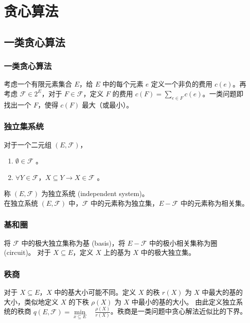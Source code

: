 \section{贪心算法}
\subsection{一类贪心算法}
\subsubsection{一类贪心算法}
考虑一个有限元素集合 $E$，给 $E$ 中的每个元素 $e$ 定义一个非负的费用 $c(e)$。再考虑 $\mathcal{F} \in 2^E$，对于 $F \in \mathcal{F}$，定义 $F$ 的费用 $c(F) = \sum\limits_{e \in F} c(e)$。一类问题即找出一个 $F$，使得 $c(F)$ 最大（或最小）。

\subsubsection{独立集系统}
对于一个二元组 $(E, \mathcal{F})$，
\begin{enumerate}
    \item $\emptyset \in \mathcal{F}$ 。
    \item $\forall Y \in \mathcal{F}$，$X \subseteq Y \to X \in \mathcal{F}$ 。 
\end{enumerate}
称 $(E, \mathcal{F})$ 为独立系统 (independent system)。 \\
在独立系统 $(E, \mathcal{F})$ 中，$\mathcal{F}$ 中的元素称为独立集，$E - \mathcal{F}$ 中的元素称为相关集。

\subsubsection{基和圈}
将 $\mathcal{F}$ 中的极大独立集称为基 (basis)，将 $E - \mathcal{F}$ 中的极小相关集称为圈 (circuit)。
对于 $X \subseteq E$，定义 $X$ 上的基为 $X$ 中的极大独立集。

\subsubsection{秩商}
对于 $X \subseteq E$，$X$ 中的基大小可能不同。定义 $X$ 的秩 $r(X)$ 为 $X$ 中最大的基的大小，类似地定义 $X$ 的下秩 $\rho(X)$ 为 $X$ 中最小的基的大小。
由此定义独立系统的秩商 $q(E, \mathcal{F}) = \min\limits_{x \subseteq E} \quad \frac{\rho(X)}{r(X)}$。秩商是一类问题中贪心解法近似比的下界。

